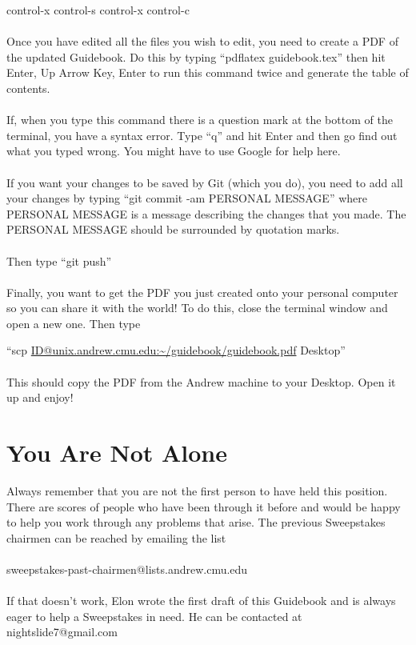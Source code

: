 control-x control-s control-x control-c
\\\\
Once you have edited all the files you wish to edit, you need to create a PDF
of the updated Guidebook. Do this by typing ``pdflatex guidebook.tex'' then
hit Enter, Up Arrow Key, Enter to run this command twice and generate the
table of contents.
\\\\
If, when you type this command there is a question mark at the bottom of
the terminal, you have a syntax error. Type ``q'' and hit Enter and then
go find out what you typed wrong. You might have to use Google for help here.
\\\\
If you want your changes to be saved by Git (which you do), you need
to add all your changes by typing ``git commit -am PERSONAL MESSAGE''
where PERSONAL MESSAGE is a message describing the changes that you made.
The PERSONAL MESSAGE should be surrounded by quotation marks.
\\\\
Then type ``git push''
\\\\
Finally, you want to get the PDF you just created onto your personal computer
so you can share it with the world! To do this, close the terminal window and
open a new one. Then type

``scp \url{ID@unix.andrew.cmu.edu:~/guidebook/guidebook.pdf} Desktop''
\\\\
This should copy the PDF from the Andrew machine to your Desktop. Open it up
and enjoy!

\section{You Are Not Alone}
\label{sec:NotAlone}

Always remember that you are not the first person to have held this position.
There are scores of people who have been through it before and would be happy
to help you work through any problems that arise. The previous Sweepstakes
chairmen can be reached by emailing the list
\\\\
sweepstakes-past-chairmen@lists.andrew.cmu.edu
\\\\
If that doesn't work, Elon wrote the first draft of this Guidebook and is
always eager to help a Sweepstakes in need. He can be contacted at nightslide7@gmail.com
